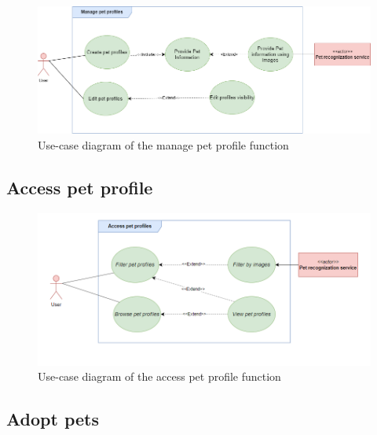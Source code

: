 \begin {figure}[H]
\centering
\includegraphics[width=1\textwidth]{Figures/manage_pet_ucd.png}
\caption{Use-case diagram of the manage pet profile function}
\label{fig:manage-pet-activity-diagram}
\end{figure}



\subsection{Access pet profile}

\begin {figure}[H]
\centering
\includegraphics[width=1\textwidth]{Figures/access_pet_ucd.png}
\caption{Use-case diagram of the access pet profile function}
\label{fig:access-pet-activity-diagram}
\end{figure}



\subsection{Adopt pets}

